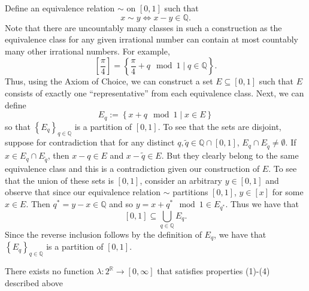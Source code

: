 \begin{example}
\label{exa:vitaliSet} Define an equivalence relation $\sim$ on $\left[0,1\right]$
such that
\[
x\sim y\Leftrightarrow x-y\in\mathbb{Q}.
\]
Note that there are uncountably many classes in such a construction
as the equivalence class for any given irrational number can contain
at most countably many other irrational numbers. For example,
\[
\left[\frac{\pi}{4}\right]=\left\{ \frac{\pi}{4}+q\mod1\mid q\in\mathbb{Q}\right\} .
\]
Thus, using the Axiom of Choice, we can construct a set $E\subseteq\left[0,1\right]$
such that $E$ consists of exactly one ``representative'' from each
equivalence class. Next, we can define
\[
E_{q}:=\left\{ x+q\mod1\mid x\in E\right\} 
\]
so that $\left\{ E_{q}\right\} _{q\in\mathbb{Q}}$ is a partition
of $\left[0,1\right]$. To see that the sets are disjoint, suppose
for contradiction that for any distinct $q,\tilde{q}\in\mathbb{Q}\cap\left[0,1\right]$,
$E_{q}\cap E_{\tilde{q}}\neq\emptyset$. If $x\in E_{q}\cap E_{\tilde{q}}$,
then $x-q\in E$ and $x-\tilde{q}\in E$. But they clearly belong
to the same equivalence class and this is a contradiction given our
construction of $E.$ To see that the union of these sets is $\left[0,1\right]$,
consider an arbitrary $y\in\left[0,1\right]$ and observe that since
our equivalence relation $\sim$ partitions $\left[0,1\right]$, $y\in\left[x\right]$
for some $x\in E$. Then $q^{*}=y-x\in\mathbb{Q}$ and so $y=x+q^{*}\mod1\in E_{q^{*}}$.
Thus we have that
\[
\left[0,1\right]\subseteq\bigcup_{q\in\mathbb{Q}}E_{q}.
\]
Since the reverse inclusion follows by the definition of $E_{q}$,
we have that $\left\{ E_{q}\right\} _{q\in\mathbb{Q}}$ is a partition
of $\left[0,1\right]$.
\end{example}

\begin{prop}
\label{prop:vitalitSetNotMeasurable}There exists no function $\lambda:2^{\mathds{R}}\longrightarrow\left[0,\infty\right]$
that satisfies properties (1)-(4) described above
\end{prop}

